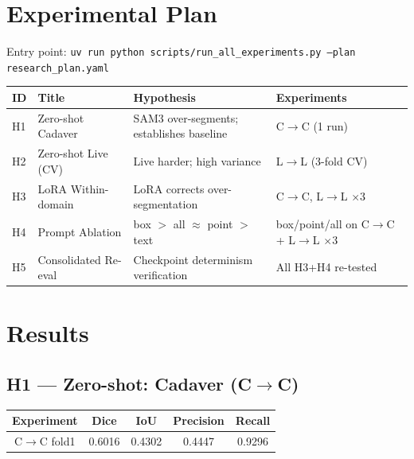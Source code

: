 \documentclass[11pt, a4paper]{article}
\begin{document}
\section{Experimental Plan}

Entry point: \texttt{uv run python scripts/run\_all\_experiments.py --plan research\_plan.yaml}

\begin{center}
\begin{tabular}{C{1cm} C{3.2cm} C{5cm} C{4cm}}
\toprule
\textbf{ID} & \textbf{Title} & \textbf{Hypothesis} & \textbf{Experiments} \\
\midrule
H1 & Zero-shot Cadaver    & SAM3 over-segments; establishes baseline & C$\to$C (1 run) \\
H2 & Zero-shot Live (CV)  & Live harder; high variance               & L$\to$L (3-fold CV) \\
H3 & LoRA Within-domain   & LoRA corrects over-segmentation          & C$\to$C, L$\to$L $\times$3 \\
H4 & Prompt Ablation      & box $>$ all $\approx$ point $>$ text     & box/point/all on C$\to$C + L$\to$L $\times$3 \\
H5 & Consolidated Re-eval & Checkpoint determinism verification       & All H3+H4 re-tested \\
\bottomrule
\end{tabular}
\end{center}

\section{Results}

\subsection{H1 --- Zero-shot: Cadaver (C$\to$C)}

\begin{center}
\begin{tabular}{ccccc}
\toprule
\textbf{Experiment} & \textbf{Dice} & \textbf{IoU} & \textbf{Precision} & \textbf{Recall} \\
\midrule
C$\to$C fold1 & 0.6016 & 0.4302 & \textcolor{warn}{0.4447} & \textcolor{sota}{0.9296} \\
\bottomrule
\end{tabular}
\end{center}
\end{document}
